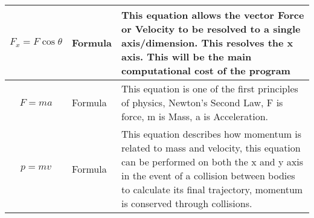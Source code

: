 \begin{table}[htbp]
\begin{tabular}{|M{3cm}|M{3cm}|m{8cm}|}
\hline
$$F_x=F\cos{\theta}$$ & Formula & This equation allows the vector Force or Velocity to be resolved to a single axis/dimension. This resolves the x axis. This will be the main computational cost of the program \\
\hline
$$F=ma$$ & Formula & This equation is one of the first principles of physics, Newton's Second Law, F is force, m is Mass, a is Acceleration. \\
\hline
$$p=mv$$ & Formula & This equation describes how momentum is related to mass and velocity, this equation can be performed on both the x and y axis in the event of a collision between bodies to calculate its final trajectory, momentum is conserved through collisions. \\
\hline
\end{tabular}
\end{table} 